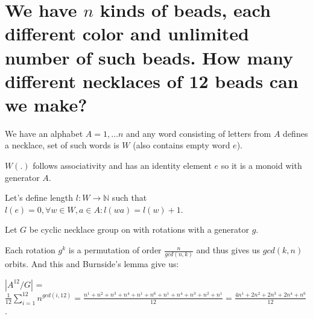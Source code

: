 \documentclass[11pt]{article}
\begin{document}
    \part*{We have $n$ kinds of beads, each different color and unlimited number of such beads. How many different necklaces of 12 beads can we make?}

    We have an alphabet $A = {1, \dots n}$ and any word consisting of letters from $A$ defines a necklace, set of such words is $W$ (also contains empty word $e$).

    $W(.)$ follows associativity and has an identity element $e$ so it is a monoid with generator $A$.

    Let's define length $l: W \rightarrow \mathbb{N}$ such that $l(e) = 0, \forall w \in W, a \in A: l(wa) = l(w) + 1$.

    Let $G$ be cyclic necklace group on with rotations with a generator $g$.

    Each rotation $g^k$ is a permutation of order $\frac{n}{gcd(n,k)}$ and thus gives us $gcd(k,n)$ orbits. And this and Burnside's lemma give us:

    $|A^{12} / G|$ = $\frac{1}{12} \sum\limits_{i=1}^{12} n^{gcd(i,12)} = \frac{n^1+n^2+n^3+n^4+n^1+n^6+n^1+n^4+n^3+n^2+n^1}{12} = \frac{4n^1+2n^2+2n^3+2n^4+n^6}{12}$.
\end{document}

